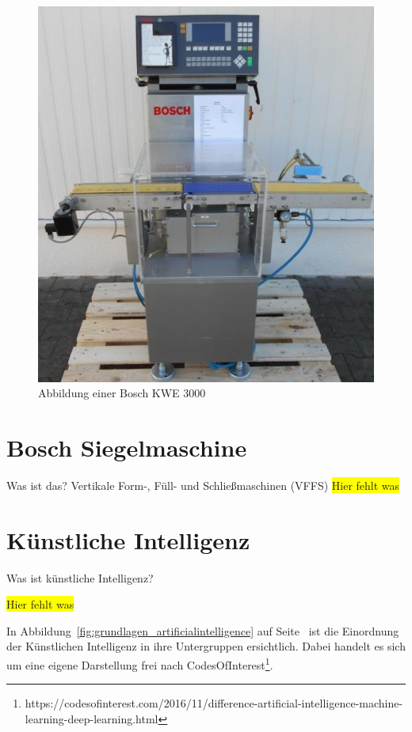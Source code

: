 \begin{figure}[h]
    \centering
    \includegraphics[scale=0.3]{images/kapitel_2/bosch_kwe.jpg}
    \caption{Abbildung einer Bosch KWE 3000}
    \label{fig:grundlagen_boschkwe}
\end{figure}

\section{Bosch Siegelmaschine}
Was ist das? Vertikale Form-, Füll- und Schließmaschinen (VFFS)
\colorbox{yellow}{Hier fehlt was}

\section{Künstliche Intelligenz}
Was ist künstliche Intelligenz?

\colorbox{yellow}{Hier fehlt was}

In Abbildung~\ref{fig:grundlagen_artificialintelligence} auf Seite~\pageref{fig:grundlagen_artificialintelligence} ist
die Einordnung der Künstlichen Intelligenz in ihre Untergruppen ersichtlich. Dabei handelt es sich um eine eigene
Darstellung frei nach CodesOfInterest\footnote{https://codesofinterest.com/2016/11/difference-artificial-intelligence-machine-learning-deep-learning.html}.

